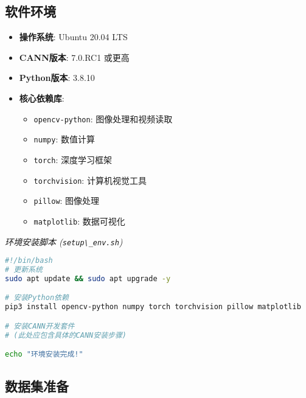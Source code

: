 \subsection{软件环境}\label{ux8f6fux4ef6ux73afux5883}

\begin{itemize}
\tightlist
\item
  \textbf{操作系统}: Ubuntu 20.04 LTS
\item
  \textbf{CANN版本}: 7.0.RC1 或更高
\item
  \textbf{Python版本}: 3.8.10
\item
  \textbf{核心依赖库}:

  \begin{itemize}
  \tightlist
  \item
    \passthrough{\lstinline!opencv-python!}: 图像处理和视频读取
  \item
    \passthrough{\lstinline!numpy!}: 数值计算
  \item
    \passthrough{\lstinline!torch!}: 深度学习框架
  \item
    \passthrough{\lstinline!torchvision!}: 计算机视觉工具
  \item
    \passthrough{\lstinline!pillow!}: 图像处理
  \item
    \passthrough{\lstinline!matplotlib!}: 数据可视化
  \end{itemize}
\end{itemize}

\emph{环境安装脚本 (\passthrough{\lstinline!setup\_env.sh!})}

\begin{lstlisting}[language=bash]
#!/bin/bash
# 更新系统
sudo apt update && sudo apt upgrade -y

# 安装Python依赖
pip3 install opencv-python numpy torch torchvision pillow matplotlib

# 安装CANN开发套件
# (此处应包含具体的CANN安装步骤)

echo "环境安装完成!"
\end{lstlisting}

\subsection{数据集准备}\label{ux6570ux636eux96c6ux51c6ux5907}

